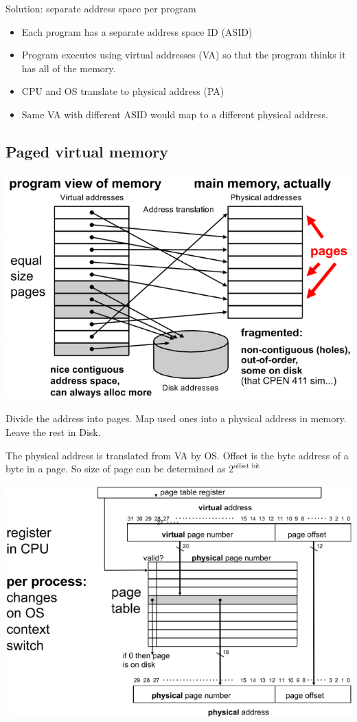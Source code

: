 \documentclass[letterpaper,12pt]{article}
\begin{document}
Solution: separate address space per program
\begin{itemize}
    \item Each program has a separate address space ID (ASID)
    \item Program executes using virtual addresses (VA) so that the program thinks it has all of the memory.
    \item CPU and OS translate to physical address (PA)
    \item Same VA with different ASID would map to a different physical address.
\end{itemize}

\subsection{Paged virtual memory}

\includegraphics*{./Image/paged virtual memory.png}

Divide the address into pages. Map used ones into a physical address in memory. Leave the rest in Disk.

The physical address is translated from VA by OS. Offset is the byte address of a byte in a page. So size of page can be determined as $2^{\text{offset bit}}$

\includegraphics*{./Image/Page table register.png}
\end{document}
